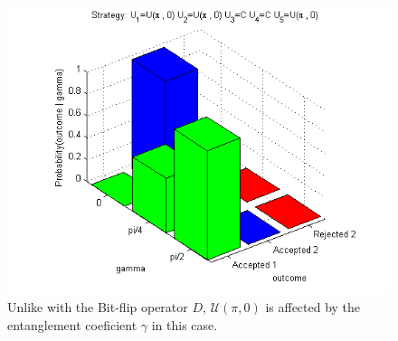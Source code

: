 \begin{table}[h]
\begin{figure}[h]
\centering 
\includegraphics[scale=0.80]{Figures/1.5qubit/Upi0Upi0CCUpi0.png}
\caption{Unlike with the Bit-flip operator $D$, $\mathcal{U} (\pi, 0)$ is affected by the entanglement coeficient $\gamma$ in this case. }
\label{fig:pg_3players_99_0_1:3}
\end{figure}

\end{table}
